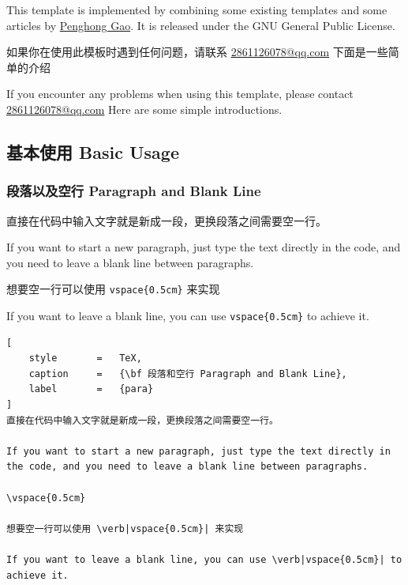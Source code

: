 \documentclass{article}
\begin{document}
\vspace{0.5cm}

This template is implemented by combining some existing templates and some articles by \href{https://github.com/AlmostGPH}{Penghong Gao}. It is released under the GNU General Public License.

\vspace{0.5cm}


如果你在使用此模板时遇到任何问题，请联系 \href{2861126078@qq.com}{2861126078@qq.com} 下面是一些简单的介绍
\vspace{0.5cm}

If you encounter any problems when using this template, please contact \href{2861126078@qq.com}{2861126078@qq.com} Here are some simple introductions.

\subsection{基本使用 Basic Usage}

\subsubsection{段落以及空行 Paragraph and Blank Line}

直接在代码中输入文字就是新成一段，更换段落之间需要空一行。

If you want to start a new paragraph, just type the text directly in the code, and you need to leave a blank line between paragraphs.

\vspace{0.5cm}

想要空一行可以使用 \verb|vspace{0.5cm}| 来实现

If you want to leave a blank line, you can use \verb|vspace{0.5cm}| to achieve it.

\begin{lstlisting}[
    style       =   TeX,
    caption     =   {\bf 段落和空行 Paragraph and Blank Line},
    label       =   {para}
]
直接在代码中输入文字就是新成一段，更换段落之间需要空一行。

If you want to start a new paragraph, just type the text directly in the code, and you need to leave a blank line between paragraphs.

\vspace{0.5cm}

想要空一行可以使用 \verb|vspace{0.5cm}| 来实现

If you want to leave a blank line, you can use \verb|vspace{0.5cm}| to achieve it.

\end{lstlisting}
\end{document}
